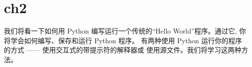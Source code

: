 \chapter{ch2}

我们将看一下如何用 Python 编写运行一个传统的“Hello World”程序。通过它,
你将学会如何编写、保存和运行 Python 程序。
有两种使用 Python 运行你的程序的方式 —— 使用交互式的带提示符的解释器或
使用源文件。我们将学习这两种方法。

